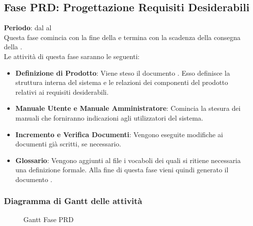 \subsection{Fase PRD: Progettazione Requisiti Desiderabili}
	\textbf{Periodo}: dal  al  \\Questa fase comincia con la fine della  e termina con la scadenza della consegna della .\\Le attività di questa fase saranno le seguenti:
	\begin{itemize}
		\item\textbf{Definizione di Prodotto}: Viene steso il documento . Esso definisce la struttura interna del sistema e le relazioni dei componenti del prodotto relativi ai requisiti desiderabili.
		\item\textbf{Manuale Utente e Manuale Amministratore}: Comincia la stesura dei manuali che forniranno indicazioni agli utilizzatori del sistema.
		\item\textbf{Incremento e Verifica Documenti}: Vengono eseguite modifiche ai documenti già scritti, se necessario.
		\item\textbf{Glossario}: Vengono aggiunti al file  i vocaboli dei quali si ritiene necessaria una definizione formale. Alla fine di questa fase vieni quindi generato il documento .
	\end{itemize}
	\subsubsection{Diagramma di Gantt delle attività}
	\begin{figure}\centering
	\caption{Gantt Fase PRD}
\end{figure}